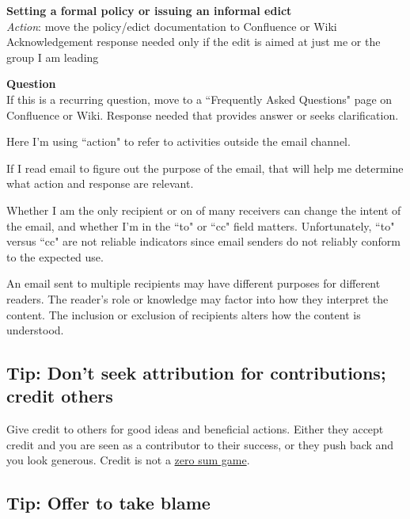 \textbf{Setting a formal policy or issuing an informal edict}\\
\textit{Action}: move the policy/edict documentation to Confluence or Wiki
Acknowledgement response needed only if the edit is aimed at just me or the group I am leading

\textbf{Question}\\
If this is a recurring question, move to a ``Frequently Asked Questions" page on Confluence or Wiki.
Response needed that provides answer or seeks clarification.


Here I'm using ``action" to refer to activities outside the email channel. 

If I read email to figure out the purpose of the email, that will help me determine what action and response are relevant. 

Whether I am the only recipient or on of many receivers can change the intent of the email, and whether I'm in the ``to" or ``cc" field matters. Unfortunately, ``to" versus ``cc" are not reliable indicators since email senders do not reliably conform to the expected use. 




An email sent to multiple recipients may have different purposes for different readers. The reader's role or knowledge may factor into how they interpret the content. The inclusion or exclusion of recipients alters how the content is understood. 

\subsection*{Tip: Don't seek attribution for contributions; credit others\label{sec:credit-others}}

Give credit to others for good ideas and beneficial actions. Either they accept credit and you are seen as a contributor to their success, or they push back and you look generous. Credit is not a \href{https://en.wikipedia.org/wiki/Zero-sum_game}{zero sum game}.

\subsection*{Tip: Offer to take blame\label{sec:take-blame}}

